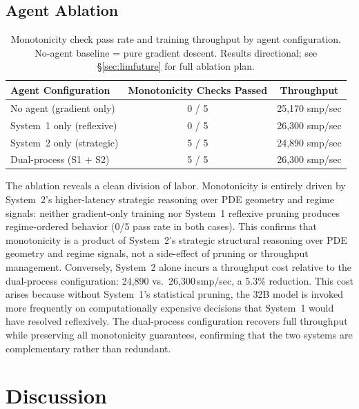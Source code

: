 \documentclass[11pt,a4paper]{article}
\begin{document}
\subsection{Agent Ablation}
\label{sec:experiments:ablation}

\begin{table}[ht]
\centering
\caption{Monotonicity check pass rate and training throughput by agent configuration.
No-agent baseline = pure gradient descent. Results directional; see \S\ref{sec:limfuture}
for full ablation plan.}
\begin{tabular}{@{}lcc@{}}
\toprule
Agent Configuration & Monotonicity Checks Passed & Throughput \\
\midrule
No agent (gradient only) & 0 / 5 & 25,170 smp/sec \\
System~1 only (reflexive) & 0 / 5 & 26,300 smp/sec \\
System~2 only (strategic) & 5 / 5 & 24,890 smp/sec \\
Dual-process (S1 + S2) & 5 / 5 & 26,300 smp/sec \\
\bottomrule
\end{tabular}
\label{tab:ablation}
\end{table}

The ablation reveals a clean division of labor. Monotonicity is entirely driven by
System~2's higher-latency strategic reasoning over PDE geometry and regime signals:
neither gradient-only training nor System~1 reflexive
pruning produces regime-ordered behavior (0/5 pass rate in both cases). This confirms
that monotonicity is a product of System~2's strategic structural reasoning over PDE
geometry and regime signals, not a side-effect of pruning or throughput management.
Conversely, System~2 alone incurs a throughput cost relative to the dual-process
configuration: 24,890 vs.\ 26,300\,smp/sec, a 5.3\% reduction. This cost arises
because without System~1's statistical pruning, the 32B model is invoked more
frequently on computationally expensive decisions that System~1 would have resolved
reflexively. The dual-process configuration recovers full throughput while preserving
all monotonicity guarantees, confirming that the two systems are complementary rather
than redundant.

\section{Discussion}
\label{sec:discussion}
\end{document}
